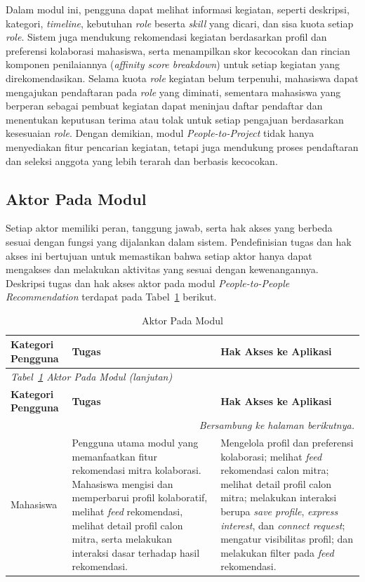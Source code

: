Dalam modul ini, pengguna dapat melihat informasi kegiatan, seperti deskripsi, kategori, \emph{timeline}, kebutuhan \emph{role} beserta \emph{skill} yang dicari, dan sisa kuota setiap \emph{role}. Sistem juga mendukung rekomendasi kegiatan berdasarkan profil dan preferensi kolaborasi mahasiswa, serta menampilkan skor kecocokan dan rincian komponen penilaiannya (\emph{affinity score breakdown}) untuk setiap kegiatan yang direkomendasikan. Selama kuota \emph{role} kegiatan belum terpenuhi, mahasiswa dapat mengajukan pendaftaran pada \emph{role} yang diminati, sementara mahasiswa yang berperan sebagai pembuat kegiatan dapat meninjau daftar pendaftar dan menentukan keputusan terima atau tolak untuk setiap pengajuan berdasarkan kesesuaian \emph{role}. Dengan demikian, modul \emph{People-to-Project} tidak hanya menyediakan fitur pencarian kegiatan, tetapi juga mendukung proses pendaftaran dan seleksi anggota yang lebih terarah dan berbasis kecocokan.

\subsection{Aktor Pada Modul}

Setiap aktor memiliki peran, tanggung jawab, serta hak akses yang berbeda sesuai dengan fungsi yang dijalankan dalam sistem. Pendefinisian tugas dan hak akses ini bertujuan untuk memastikan bahwa setiap aktor hanya dapat mengakses dan melakukan aktivitas yang sesuai dengan kewenangannya. Deskripsi tugas dan hak akses aktor pada modul \emph{People-to-People Recommendation} terdapat pada Tabel~\ref{tab:aktor-modul} berikut.

\begin{longtable}{p{2cm} p{5.5cm} >{\raggedright\arraybackslash}p{\dimexpr\linewidth-7.5cm-6\tabcolsep\relax}}
  \caption{Aktor Pada Modul}
  \label{tab:aktor-modul} \\
  \toprule
    \textbf{Kategori Pengguna} & \textbf{Tugas} & \textbf{Hak Akses ke Aplikasi} \\
  \midrule
  \endfirsthead
  \multicolumn{3}{l}{\small\textit{Tabel~\ref{tab:aktor-modul} Aktor Pada Modul (lanjutan)}} \\
  \toprule
    \textbf{Kategori Pengguna} & \textbf{Tugas} & \textbf{Hak Akses ke Aplikasi} \\
  \midrule
  \endhead
  \bottomrule
  \multicolumn{3}{r}{\textit{Bersambung ke halaman berikutnya.}} \\
  \endfoot
  \bottomrule
  \endlastfoot
    Mahasiswa & Pengguna utama modul yang memanfaatkan fitur rekomendasi mitra kolaborasi. Mahasiswa mengisi dan memperbarui profil kolaboratif, melihat \emph{feed} rekomendasi, melihat detail profil calon mitra, serta melakukan interaksi dasar terhadap hasil rekomendasi. & Mengelola profil dan preferensi kolaborasi; melihat \emph{feed} rekomendasi calon mitra; melihat detail profil calon mitra; melakukan interaksi berupa \emph{save profile}, \emph{express interest}, dan \emph{connect request}; mengatur visibilitas profil; dan melakukan filter pada \emph{feed} rekomendasi. \\
\end{longtable}

